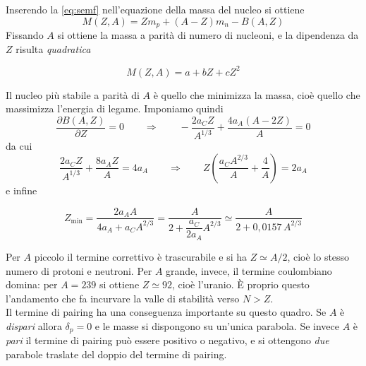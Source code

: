 Inserendo la \eqref{eq:semf} nell'equazione della massa del nucleo si ottiene
%
\begin{equation}
    M(Z,A) = Z m_p + (A - Z) m_n - B(A,Z)
\end{equation}
Fissando $A$ si ottiene la massa a parità di numero di nucleoni, e la dipendenza da $Z$ risulta \emph{quadratica}
%
\begin{tcolorbox}[colback=black!5!white, colframe=black!45!white, boxrule=0.8pt]
\begin{equation}
    M(Z,A) = a + bZ + cZ^2
\end{equation}
\end{tcolorbox}
Il nucleo più stabile a parità di $A$ è quello che minimizza la massa, cioè quello che massimizza l'energia di legame. Imponiamo quindi
%
\begin{equation}
    \frac{\partial B(A,Z)}{\partial Z} = 0 \qquad \Longrightarrow \qquad - \frac{2 a_C Z}{A^{1/3}} + \frac{4 a_A (A - 2Z)}{A} = 0
\end{equation}
da cui
%
\begin{equation}
    \frac{2 a_C Z}{A^{1/3}} + \frac{8 a_A Z}{A} = 4 a_A \qquad \Longrightarrow \qquad Z \left( \frac{a_C A^{2/3}}{A} + \frac{4}{A} \right) = 2 a_A
\end{equation}
e infine
%
\begin{tcolorbox}[colback=black!5!white, colframe=black!45!white, boxrule=0.8pt]
\begin{equation}
    Z_{\min} = \frac{2 a_A A}{4 a_A + a_C A^{2/3}} = \frac{A}{2 + \dfrac{a_C}{2 a_A} A^{2/3}} \simeq \frac{A}{2 + 0,0157 \, A^{2/3}}
    \label{eq:zmin}
\end{equation}
\end{tcolorbox}
Per $A$ piccolo il termine correttivo è trascurabile e si ha $Z \simeq A/2$, cioè lo stesso numero di protoni e neutroni. Per $A$ grande, invece, il termine coulombiano domina: per $A = 239$ si ottiene $Z \simeq 92$, cioè l'uranio. È proprio questo l'andamento che fa incurvare la valle di stabilità verso $N > Z$.\\

Il termine di pairing ha una conseguenza importante su questo quadro. Se $A$ è \emph{dispari} allora $\delta_p = 0$ e le masse si dispongono su un'unica parabola. Se invece $A$ è \emph{pari} il termine di pairing può essere positivo o negativo, e si ottengono \emph{due} parabole traslate del doppio del termine di pairing. 

